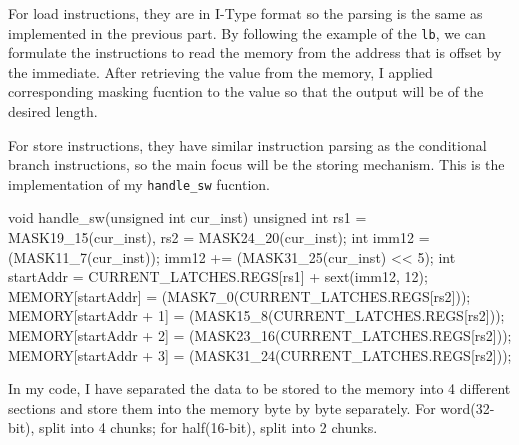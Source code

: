 \documentclass[10pt, a4paper]{article}
\begin{document}
\begin{ans}
For load instructions, they are in I-Type format so the parsing is the same as implemented in the previous part. 
By following the example of the \texttt{lb}, we can formulate the instructions to read the memory from the address that is offset by the immediate. 
After retrieving the value from the memory, I applied corresponding masking fucntion to the value so that the output will be of the desired length. 

For store instructions, they have similar instruction parsing as the conditional branch instructions, so the main focus will be the storing mechanism. 
This is the implementation of my \texttt{handle\_sw} fucntion. 

\begin{code}
void handle_sw(unsigned int cur_inst) {
    unsigned int rs1 = MASK19_15(cur_inst), rs2 = MASK24_20(cur_inst);
    int imm12 = (MASK11_7(cur_inst));
    imm12 += (MASK31_25(cur_inst) << 5);
    int startAddr = CURRENT_LATCHES.REGS[rs1] + sext(imm12, 12);
    MEMORY[startAddr] = (MASK7_0(CURRENT_LATCHES.REGS[rs2]));
    MEMORY[startAddr + 1] = (MASK15_8(CURRENT_LATCHES.REGS[rs2]));
    MEMORY[startAddr + 2] = (MASK23_16(CURRENT_LATCHES.REGS[rs2]));
    MEMORY[startAddr + 3] = (MASK31_24(CURRENT_LATCHES.REGS[rs2]));
}
\end{code}
In my code, I have separated the data to be stored to the memory into 4 different sections and store 
them into the memory byte by byte separately. For word(32-bit), split into 4 chunks; for half(16-bit), split into 2 chunks. 

\end{ans}
\end{document}
